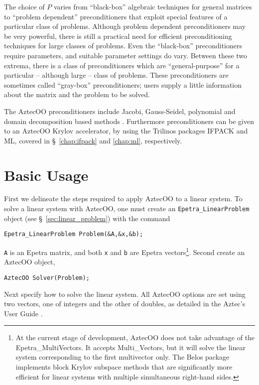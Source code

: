 \smallskip

The choice of $P$ varies from ``black-box'' algebraic techniques
for general matrices to ``problem dependent''
preconditioners that exploit special features of a particular class
of problems. Although problem dependent preconditioners may be very
powerful, there is still a practical need for efficient
preconditioning techniques for large classes of problems. 
Even the ``black-box'' preconditioners require parameters, and suitable
parameter settings do vary.  Between these two extrema, 
there is a class of preconditioners which are
``general-purpose'' for a particular -- although large -- class of
problems.  These preconditioners are sometimes called ``gray-box''
preconditioners; users supply a little information about
the matrix and the problem to be solved.

The AztecOO preconditioners include Jacobi, Gauss-Seidel, polynomial and
domain decomposition based methods \cite{smbg:96}. 
Furthermore preconditioners can be
given to an AztecOO Krylov accelerator, by using the Trilinos packages
IFPACK and ML, covered in \S~\ref{chap:ifpack} and \ref{chap:ml},
respectively.


\section{Basic Usage}
\label{sec:basic_aztecoo}

First we delineate the steps required to apply 
AztecOO to a linear system.
To solve a linear system with AztecOO, one must create an
\verb!Epetra_LinearProblem!  object (see
\S~\ref{sec:linear_problem}) with the command
\begin{verbatim}
Epetra_LinearProblem Problem(&A,&x,&b);
\end{verbatim}
\verb!A! is an Epetra matrix, and both \verb!x! and \verb!b! are Epetra
vectors\footnote{At the current stage of development, AztecOO does not
  take advantage of the Epetra\_MultiVectors. It accepts Multi\_Vectors,
  but it will solve the linear system corresponding to the first
  multivector only.
  The Belos package implements block Krylov subspace methods that are
  significantly more efficient for linear systems with multiple simultaneous right-hand sides.
}.  Second create an AztecOO object,
\begin{verbatim}
AztecOO Solver(Problem);
\end{verbatim}
Next specify how to solve the linear system. All AztecOO options are set
using two vectors, one of integers and the other of doubles, as detailed
in the Aztec's User Guide \cite{Aztec2.1}.

